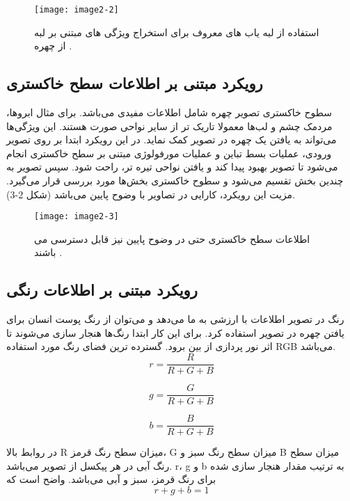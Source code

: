 \begin{figure}[h]
\centering
  \texttt{[image: image2-2]}
  \caption{استفاده از لبه یاب های معروف برای استخراج ویژگی های مبتنی بر لبه از چهره  \cite{ref1}.}
  \label{image2-2}
\end{figure}

\subsection{رویکرد مبتنی بر اطلاعات سطح خاکستری} 
سطوح خاکستری تصویر چهره شامل اطلاعات مفیدی می‌باشد. برای مثال ابرو‌ها، مردمک چشم و لب‌ها معمولا تاریک تر از سایر نواحی صورت هستند. این ویژگی‌ها می‌تواند به یافتن یک چهره در تصویر کمک نماید. در این رویکرد ابتدا بر روی تصویر ورودی، عملیات بسط تباین  و عملیات مورفولوژی  مبتنی بر سطح خاکستری انجام می‌شود تا تصویر بهبود پیدا کند و یافتن نواحی تیره تر، راحت شود. سپس تصویر به چندین بخش تقسیم می‌شود و سطوح خاکستری بخش‌ها مورد بررسی قرار می‌گیرد. مزیت این رویکرد، کارایی در تصاویر با وضوح پایین می‌باشد (شکل 2-3).

\begin{figure}[h]
\centering
  \texttt{[image: image2-3]}
  \caption{اطلاعات سطح خاکستری حتی در وضوح پایین نیز قابل دسترسی می باشند  \cite{ref1}.}
  \label{image2-3}
\end{figure}

\subsection{رویکرد مبتنی بر اطلاعات رنگی}
رنگ در تصویر اطلاعات با ارزشی به ما می‌دهد و می‌توان از رنگ پوست انسان برای یافتن چهره در تصویر استفاده کرد. برای این کار ابتدا رنگ‌ها هنجار سازی  می‌شوند تا اثر نور پردازی از بین برود. گسترده ترین فضای رنگ مورد استفاده RGB می‌باشد.
\begin{equation}\label{eq2-1}
r = \frac{R}{R + G + B}
\end{equation}

\begin{equation}\label{eq2-2}
g = \frac{G}{R + G + B}
\end{equation}

\begin{equation}\label{eq2-3}
b = \frac{B}{R + G + B}
\end{equation}

در روابط بالا R میزان سطح رنگ قرمز، G میزان سطح رنگ سبز و B میزان سطح رنگ آبی در هر پیکسل از تصویر می‌باشد. r، g و b به ترتیب مقدار هنجار سازی شده برای رنگ قرمز، سبز و آبی می‌باشد. واضح است که
\begin{equation}\label{eq2-3}
r + g + b = 1
\end{equation}
 	
